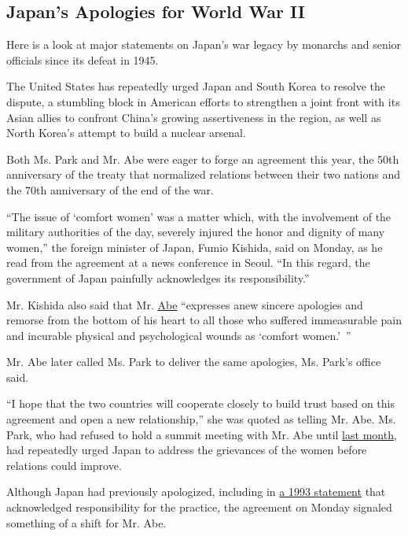 \hypertarget{japans-apologies-for-world-war-ii}{%
\subsection{Japan's Apologies for World War
II}\label{japans-apologies-for-world-war-ii}}

Here is a look at major statements on Japan's war legacy by monarchs and
senior officials since its defeat in 1945.

The United States has repeatedly urged Japan and South Korea to resolve
the dispute, a stumbling block in American efforts to strengthen a joint
front with its Asian allies to confront China's growing assertiveness in
the region, as well as North Korea's attempt to build a nuclear arsenal.

Both Ms. Park and Mr. Abe were eager to forge an agreement this year,
the 50th anniversary of the treaty that normalized relations between
their two nations and the 70th anniversary of the end of the war.

``The issue of `comfort women' was a matter which, with the involvement
of the military authorities of the day, severely injured the honor and
dignity of many women,'' the foreign minister of Japan, Fumio Kishida,
said on Monday, as he read from the agreement at a news conference in
Seoul. ``In this regard, the government of Japan painfully acknowledges
its responsibility.''

Mr. Kishida also said that Mr.
\href{http://topics.nytimes3xbfgragh.onion/top/reference/timestopics/people/a/shinzo_abe/index.html?inline=nyt-per}{Abe}
``expresses anew sincere apologies and remorse from the bottom of his
heart to all those who suffered immeasurable pain and incurable physical
and psychological wounds as `comfort women.'~''

Mr. Abe later called Ms. Park to deliver the same apologies, Ms. Park's
office said.

``I hope that the two countries will cooperate closely to build trust
based on this agreement and open a new relationship,'' she was quoted as
telling Mr. Abe. Ms. Park, who had refused to hold a summit meeting with
Mr. Abe until
\href{http://www.nytimes3xbfgragh.onion/2015/11/02/world/asia/japan-south-korea-summit-park-geun-hye-shinzo-abe.html}{last
month}, had repeatedly urged Japan to address the grievances of the
women before relations could improve.

Although Japan had previously apologized, including in
\href{http://www.nytimes3xbfgragh.onion/1993/08/05/world/japan-admits-army-forced-women-into-war-brothels.html}{a
1993 statement} that acknowledged responsibility for the practice, the
agreement on Monday signaled something of a shift for Mr. Abe.

